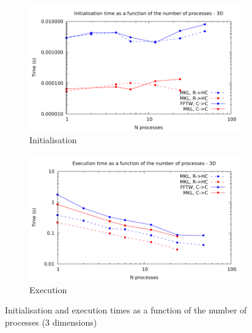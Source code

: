 \documentclass[12pt, a4paper]{article} \setlength{\textheight}{24cm}
\begin{document}
\begin{figure}[H]
  \captionsetup{width=0.8\linewidth}
  \centering
  \begin{subfigure}{.5\textwidth}
    \centering
    \includegraphics[width=.9\linewidth]{graphs/mpi-init-3d.pdf}
    \caption{Initialisation}
    \label{3DMPII}
  \end{subfigure}%
  \begin{subfigure}{.5\textwidth}
    \centering
    \includegraphics[width=.9\linewidth]{graphs/mpi-exec-3d.pdf}
    \caption{Execution}
    \label{3DMPIE}
  \end{subfigure}
  \caption{Initialisation and execution times as a function of the
    number of processes (3 dimensions)}
  \label{3DMPI}
\end{figure}
\end{document}
